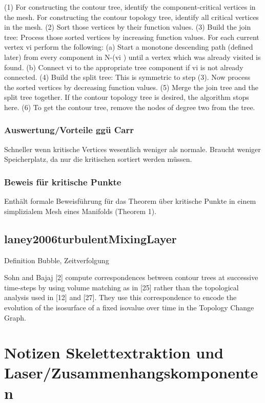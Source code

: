 (1) For constructing the contour tree, identify the component-critical vertices in the mesh. For constructing the contour topology tree, identify all critical vertices in the mesh.
(2) Sort those vertices by their function values.
(3) Build the join tree: Process those sorted vertices by increasing function values. For each current vertex vi perform the following:
(a) Start a monotone descending path (defined later) from every component in N-(vi ) until a vertex which was already visited is found.
(b) Connect vi to the appropriate tree component if vi is not already connected.
(4) Build the split tree: This is symmetric to step (3). Now process the sorted vertices by decreasing function values.
(5) Merge the join tree and the split tree together. If the contour topology tree is desired, the algorithm stops here.
(6) To get the contour tree, remove the nodes of degree two from the tree.


\subsection{Auswertung/Vorteile ggü Carr}

Schneller wenn kritische Vertices wesentlich weniger als normale.
Braucht weniger Speicherplatz, da nur die kritischen sortiert werden müssen.

\subsection{Beweis für kritische Punkte}
Enthält formale Beweisführung für das Theorem über kritische Punkte in einem simplizialem Mesh eines Manifolds (Theorem 1).


\section{laney2006turbulentMixingLayer}
\cite{laney2006turbulentMixingLayer}
Definition Bubble, Zeitverfolgung

\cite[S.~1055]{laney2006turbulentMixingLayer} Sohn and Bajaj [2] compute correspondences between contour trees at successive time-steps by using volume matching as in [25] rather than the topological analysis used in [12] and [27]. They use this correspondence to encode the evolution of the isosurface of a fixed isovalue over time in the Topology Change Graph. 

\chapter{Notizen Skelettextraktion und Laser/Zusammenhangskomponenten}

